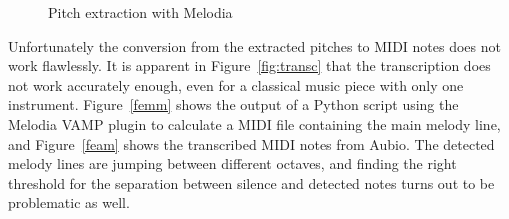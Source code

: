 \begin{figure}[htbp]
	\centering
	\caption{Pitch extraction with Melodia}
	\label{fig:melodia}
\end{figure}

\noindent Unfortunately the conversion from the extracted pitches to MIDI notes does not work flawlessly. It is apparent in Figure~\ref{fig:transc} that the transcription does not work accurately enough, even for a classical music piece with only one instrument. Figure~\ref{femm} shows the output of a Python script using the Melodia VAMP plugin to calculate a MIDI file containing the main melody line, and Figure~\ref{feam} shows the transcribed MIDI notes from Aubio. The detected melody lines are jumping between different octaves, and finding the right threshold for the separation between silence and detected notes turns out to be problematic as well.

